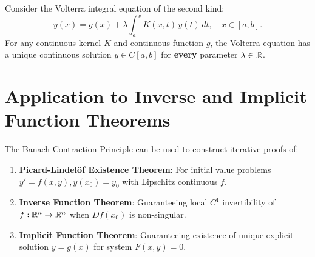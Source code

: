 \begin{theorem}
Consider the Volterra integral equation of the second kind:
\[
y(x) = g(x) + \lambda \int_a^x K(x,t) \, y(t) \, dt, \quad x \in [a,b].
\]
For any continuous kernel $K$ and continuous function $g$, the Volterra equation has a unique continuous solution $y \in C[a,b]$ for \textbf{every} parameter $\lambda \in \mathbb{R}$.
\end{theorem}


\section{Application to Inverse and Implicit Function Theorems}
\label{sec:implicit_function}

The Banach Contraction Principle can be used to construct iterative proofs of:
\begin{enumerate}[label=\rm{(\roman*)}]
    \item \textbf{Picard-Lindelöf Existence Theorem}: For initial value problems $y' = f(x,y), y(x_0) = y_0$ with Lipschitz continuous $f$.
    \item \textbf{Inverse Function Theorem}: Guaranteeing local $C^1$ invertibility of $f: \mathbb{R}^n \to \mathbb{R}^n$ when $Df(x_0)$ is non-singular.
    \item \textbf{Implicit Function Theorem}: Guaranteeing existence of unique explicit solution $y = g(x)$ for system $F(x,y) = 0$.
\end{enumerate}

